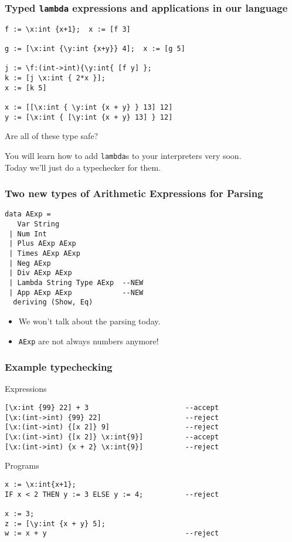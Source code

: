 \documentclass{beamer}
\begin{document}
\begin{frame}[fragile]
\frametitle{Typed {\tt lambda} expressions and applications in our language}

\begin{verbatim}
f := \x:int {x+1};  x := [f 3]   
         
g := [\x:int {\y:int {x+y}} 4];  x := [g 5]

j := \f:(int->int){\y:int{ [f y] };
k := [j \x:int { 2*x }];
x := [k 5]

x := [[\x:int { \y:int {x + y} } 13] 12]
y := [\x:int { [\y:int {x + y} 13] } 12]

\end{verbatim}
\pause
Are all of these type safe?

\pause
You will learn how to add {\tt lambda}s to your 
interpreters very soon.\\ Today we'll just do a typechecker for them.
\end{frame}

\begin{frame}[fragile]
\frametitle{Two new types of Arithmetic Expressions for Parsing}
\begin{verbatim}
data AExp =
   Var String
 | Num Int
 | Plus AExp AExp
 | Times AExp AExp 
 | Neg AExp
 | Div AExp AExp
 | Lambda String Type AExp  --NEW
 | App AExp AExp            --NEW
  deriving (Show, Eq)
\end{verbatim}

\vfill
\begin{itemize}
\item
We won't talk about the parsing today.
\item
{\tt AExp} are not always numbers anymore!
\end{itemize}
\end{frame}


\begin{frame}[fragile]
\frametitle{Example typechecking}
Expressions
\begin{verbatim}
[\x:int {99} 22] + 3                       --accept
[\x:(int->int) {99} 22]                    --reject
[\x:(int->int) {[x 2]} 9]                  --reject
[\x:(int->int) {[x 2]} \x:int{9}]          --accept
[\x:(int->int) {x + 2} \x:int{9}]          --reject
\end{verbatim}
Programs
\begin{verbatim}
x := \x:int{x+1};
IF x < 2 THEN y := 3 ELSE y := 4;          --reject

x := 3; 
z := [\y:int {x + y} 5]; 
w := x + y                                 --reject
\end{verbatim}
\end{frame}
\end{document}
